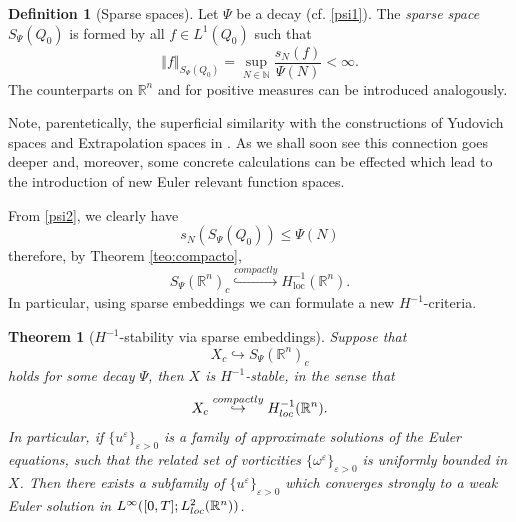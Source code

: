 \documentclass[11pt, a4paper,leqno]{amsart}
\newtheorem{theorem}{Theorem}
\theoremstyle{plain}
\numberwithin{equation}{section}
\theoremstyle{definition}
\newtheorem{definition}{Definition}
\theoremstyle{remark}
\def\R{\mathbb{R}}
\begin{document}







\begin{definition}[Sparse spaces]\label{DefSpS}
Let $\Psi$ be a decay  (cf. \eqref{psi1}). The \emph{sparse space} $S_\Psi(Q_0)$ is formed by all $f \in L^1(Q_0)$ such that
\begin{equation}
\left\Vert f\right\Vert
_{S_{\Psi}(Q_{0})}=\sup_{N\in\mathbb{N}} \frac{s_N(f)}{\Psi(N)} <\infty.\label{psi2}%
\end{equation}
The counterparts on $\R^n$ and  for positive measures can be introduced analogously.
\end{definition}

Note, parentetically, the superficial similarity with the constructions of
Yudovich spaces and Extrapolation spaces in \cite{DMEuler}. As we shall soon
see this connection goes deeper and, moreover, some concrete calculations can
be effected which lead to the introduction of new Euler relevant function spaces.

From \eqref{psi2}, we clearly have%
\[
s_{N}(S_{\Psi}(Q_0)) \leq \Psi(N)
\]
therefore, by Theorem \ref{teo:compacto},
\begin{equation}\label{116}
S_{\Psi} (\R^n)_{c}\overset{compactly}{\hookrightarrow}H_{\text{loc}}^{-1}(\R^n).
\end{equation}
In particular, using sparse embeddings we can formulate a new $H^{-1}$-criteria.

\begin{theorem}[$H^{-1}$-stability via sparse embeddings]
\label{CorFinal} Suppose that
\begin{equation}\label{117}
	X_c \hookrightarrow S_\Psi(\R^n)_c
	\end{equation}
 holds for some decay $\Psi$, then $X$ is $H^{-1}$-stable,  in the sense that
\[
X_{c}\overset{compactly}{\hookrightarrow}H_{\emph{loc}}^{-1}(\mathbb{R}^{n}).
\]
In particular, if $\{u^{\varepsilon}\}_{\varepsilon > 0}$ is a family of approximate solutions of
the Euler equations, such that the related set of vorticities $\{\omega
^{\varepsilon}\}_{\varepsilon > 0}$ is uniformly bounded in $X$. Then there exists a subfamily
of $\{u^{\varepsilon}\}_{\varepsilon > 0}$ which converges strongly to a weak Euler solution in
$L^{\infty}([0,T];L_{\emph{loc}}^{2}(\mathbb{R}^{n}))$.
\end{theorem}
\end{document}
